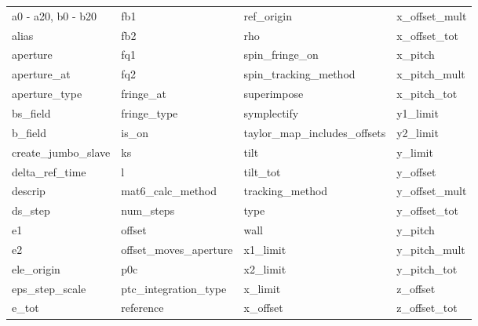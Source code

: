  \begin{tabular}{llll} \toprule
a0 - a20, b0 - b20          & fb1                         & ref_origin                  & x_offset_mult               \\
alias                       & fb2                         & rho                         & x_offset_tot                \\
aperture                    & fq1                         & spin_fringe_on              & x_pitch                     \\
aperture_at                 & fq2                         & spin_tracking_method        & x_pitch_mult                \\
aperture_type               & fringe_at                   & superimpose                 & x_pitch_tot                 \\
bs_field                    & fringe_type                 & symplectify                 & y1_limit                    \\
b_field                     & is_on                       & taylor_map_includes_offsets & y2_limit                    \\
create_jumbo_slave          & ks                          & tilt                        & y_limit                     \\
delta_ref_time              & l                           & tilt_tot                    & y_offset                    \\
descrip                     & mat6_calc_method            & tracking_method             & y_offset_mult               \\
ds_step                     & num_steps                   & type                        & y_offset_tot                \\
e1                          & offset                      & wall                        & y_pitch                     \\
e2                          & offset_moves_aperture       & x1_limit                    & y_pitch_mult                \\
ele_origin                  & p0c                         & x2_limit                    & y_pitch_tot                 \\
eps_step_scale              & ptc_integration_type        & x_limit                     & z_offset                    \\
e_tot                       & reference                   & x_offset                    & z_offset_tot                \\
 \bottomrule
 \end{tabular}
 \vfill
 
